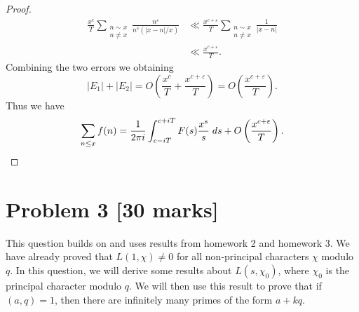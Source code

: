 \documentclass[12pt]{article}
\begin{document}
\begin{proof}
    \begin{align*}
        \frac{x^c}{T}\sum_{\substack{n\sim x\\n\neq x}}\frac{n^{\varepsilon}}{n^c(|x-n|/x)}&\ll\frac{x^{c+\varepsilon}}{T}\sum_{\substack{n\sim x\\n\neq x}}\frac{1}{|x-n|}\\
        &\ll\frac{x^{c+\varepsilon}}{T}.
    \end{align*}
    Combining the two errors we obtaining
    \[
        |E_1|+|E_2|=O\left(\frac{x^c}{T}+\frac{x^{c+\varepsilon}}{T}\right)=O\left(\frac{x^{c+\varepsilon}}{T}\right).
    \]
    Thus we have
    \[
        \sum_{n\leq x}f(n)=\frac{1}{2\pi i}\int_{c-iT}^{c+iT}F(s)\frac{x^s}{s}\;ds+O\left(\frac{x^{c+\varepsilon}}{T}\right).\qedhere
    \]
\end{proof}

\section*{Problem 3 [30 marks]} 
This question builds on and uses results from homework 2 and homework 3.  We have already proved that $L(1,\chi)\neq 0$ for all non-principal characters $\chi$ modulo $q$. In this question, we will derive some results about $L(s,\chi_0)$, where $\chi_0$ is the principal character modulo $q$. We will then use this result to prove that if $(a,q)=1$, then there are infinitely many primes of the form $a+kq$.
\end{document}
